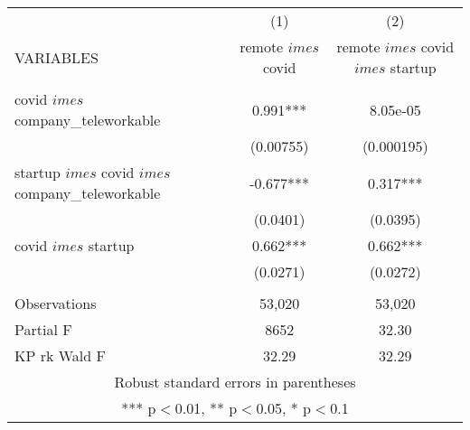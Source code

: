 \begin{tabular}{lcc} \hline
 & (1) & (2) \\
VARIABLES & remote $	imes$ covid & remote $	imes$ covid $	imes$ startup \\ \hline
 &  &  \\
covid $	imes$ company\_teleworkable & 0.991*** & 8.05e-05 \\
 & (0.00755) & (0.000195) \\
startup $	imes$ covid $	imes$ company\_teleworkable & -0.677*** & 0.317*** \\
 & (0.0401) & (0.0395) \\
covid $	imes$ startup & 0.662*** & 0.662*** \\
 & (0.0271) & (0.0272) \\
 &  &  \\
Observations & 53,020 & 53,020 \\
Partial F & 8652 & 32.30 \\
 KP rk Wald F & 32.29 & 32.29 \\ \hline
\multicolumn{3}{c}{ Robust standard errors in parentheses} \\
\multicolumn{3}{c}{ *** p$<$0.01, ** p$<$0.05, * p$<$0.1} \\
\end{tabular}
